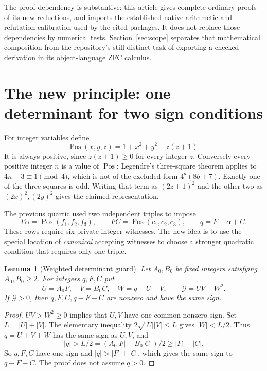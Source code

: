 \documentclass[11pt]{article}
\newtheorem{lemma}[theorem]{Lemma}
\theoremstyle{definition}\newtheorem{definition}[theorem]{Definition}
\theoremstyle{remark}\newtheorem{remark}[theorem]{Remark}
\newcommand{\Pos}{\operatorname{Pos}}
\newcommand{\PhiG}{\mathcal G}
\begin{document}
The proof dependency is substantive: this article gives complete ordinary
proofs of its new reductions, and imports the established native arithmetic
and refutation calibration used by the cited packages. It does not replace
those dependencies by numerical tests. Section~\ref{sec:scope} separates
that mathematical composition from the repository's still distinct task
of exporting a checked derivation in its object-language ZFC calculus.

\section{The new principle: one determinant for two sign conditions}
\label{sec:guard}

For integer variables define
\[
 \Pos(x,y,z)=1+x^2+y^2+z(z+1).
\]
It is always positive, since $z(z+1)\ge0$ for every integer $z$.
Conversely every positive integer $n$ is a value of $\Pos$: Legendre's
three-square theorem applies to $4n-3\equiv1\pmod4$, which is not of the
excluded form $4^a(8b+7)$. Exactly one of the three squares is odd. Writing
that term as $(2z+1)^2$ and the other two as $(2x)^2,(2y)^2$ gives the
claimed representation.

The previous quartic used two independent triples to impose
\begin{equation}\label{eq:oldguards}
 F\alpha=\Pos(f_1,f_2,f_3),\qquad
 FC=\Pos(c_1,c_2,c_3),\qquad q=F+\alpha+C.
\end{equation}
These rows require six private integer witnesses. The new idea is to use
the special location of \emph{canonical} accepting witnesses to choose a
stronger quadratic condition that requires only one triple.

\begin{lemma}[Weighted determinant guard]\label{lem:guard}
Let $A_0,B_0$ be fixed integers satisfying
$A_0,B_0\ge2$. For integers $q,F,C$ put
\[
 U=A_0F,\quad V=B_0C,\quad W=q-U-V,
 \qquad\PhiG=UV-W^2.
\]
If $\PhiG>0$, then $q,F,C,q-F-C$ are nonzero and have the same sign.
\end{lemma}
\begin{proof}
$UV>W^2\ge0$ implies that $U,V$ have one common nonzero sign.
Set $L=|U|+|V|$. The elementary inequality
$2\sqrt{|U||V|}\le L$ gives $|W|<L/2$. Thus $q=U+V+W$
has the same sign as $U,V$, and
\[
 |q|>L/2=(A_0|F|+B_0|C|)/2
                   \ge |F|+|C|.
\]
So $q,F,C$ have one sign and $|q|>|F|+|C|$, which gives the same sign
to $q-F-C$. The proof does not assume $q>0$.
\end{proof}
\end{document}
